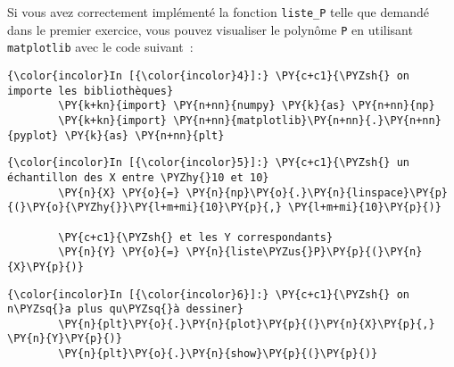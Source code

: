     Si vous avez correctement implémenté la fonction \texttt{liste\_P} telle
que demandé dans le premier exercice, vous pouvez visualiser le polynôme
\texttt{P} en utilisant \texttt{matplotlib} avec le code suivant~:

    \begin{Verbatim}[commandchars=\\\{\},frame=single,framerule=0.3mm,rulecolor=\color{cellframecolor}]
{\color{incolor}In [{\color{incolor}4}]:} \PY{c+c1}{\PYZsh{} on importe les bibliothèques}
        \PY{k+kn}{import} \PY{n+nn}{numpy} \PY{k}{as} \PY{n+nn}{np}
        \PY{k+kn}{import} \PY{n+nn}{matplotlib}\PY{n+nn}{.}\PY{n+nn}{pyplot} \PY{k}{as} \PY{n+nn}{plt}
\end{Verbatim}


    \begin{Verbatim}[commandchars=\\\{\},frame=single,framerule=0.3mm,rulecolor=\color{cellframecolor}]
{\color{incolor}In [{\color{incolor}5}]:} \PY{c+c1}{\PYZsh{} un échantillon des X entre \PYZhy{}10 et 10}
        \PY{n}{X} \PY{o}{=} \PY{n}{np}\PY{o}{.}\PY{n}{linspace}\PY{p}{(}\PY{o}{\PYZhy{}}\PY{l+m+mi}{10}\PY{p}{,} \PY{l+m+mi}{10}\PY{p}{)}
        
        \PY{c+c1}{\PYZsh{} et les Y correspondants}
        \PY{n}{Y} \PY{o}{=} \PY{n}{liste\PYZus{}P}\PY{p}{(}\PY{n}{X}\PY{p}{)}
\end{Verbatim}


    \begin{Verbatim}[commandchars=\\\{\},frame=single,framerule=0.3mm,rulecolor=\color{cellframecolor}]
{\color{incolor}In [{\color{incolor}6}]:} \PY{c+c1}{\PYZsh{} on n\PYZsq{}a plus qu\PYZsq{}à dessiner}
        \PY{n}{plt}\PY{o}{.}\PY{n}{plot}\PY{p}{(}\PY{n}{X}\PY{p}{,} \PY{n}{Y}\PY{p}{)}
        \PY{n}{plt}\PY{o}{.}\PY{n}{show}\PY{p}{(}\PY{p}{)}
\end{Verbatim}


    \begin{center}
    \end{center}
    { \hspace*{\fill} \\}
    

    
    
    
